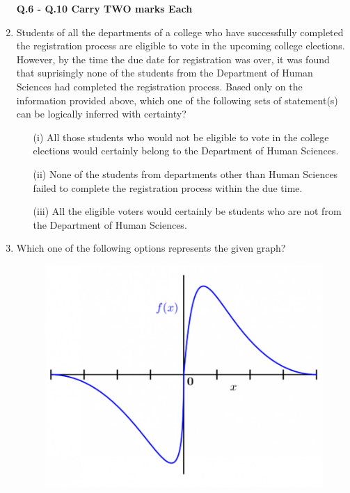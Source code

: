 \documentclass[12pt]{article}
\theoremstyle{remark}
\begin{document}
\begin{enumerate}
\begin{enumerate}
 \end{enumerate}
\hfill{}
\newpage
\textbf{Q.6 - Q.10 Carry TWO marks Each} 
\item Students of all the departments of a college who have successfully completed the
registration process are eligible to vote in the upcoming college elections. However,
by the time the due date for registration was over, it was found that suprisingly none
of the students from the Department of Human Sciences had completed the
registration process. 
Based only on the information provided above, which one of the following sets of
statement(s) can be logically inferred with certainty? 
\begin{enumerate}
\item [(i)] All those students who would not be eligible to vote in the college elections
would certainly belong to the Department of Human Sciences. 
\item [(ii)] None of the students from departments other than Human Sciences failed to
complete the registration process within the due time. 
\item [(iii)] All the eligible voters would certainly be students who are not from the
Department of Human Sciences. 
\end{enumerate} 
\begin{enumerate}  \end{enumerate}
\hfill{}
\item Which one of the following options represents the given graph? 
\begin{figure}[H]
\centering
\includegraphics{Figs/Q7.png}

\end{figure}
\end{enumerate}
\end{document}
